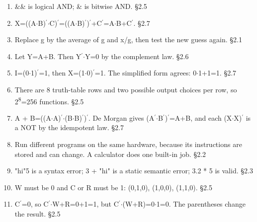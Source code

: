 \documentclass[11pt]{article}
\begin{document}
\begin{keepsection}
\begin{enumerate}
\item \&\& is logical AND; \& is bitwise AND. \hfill{\small\color{FAUblue}§2.5}
\item X=((A\ensuremath{\cdot}B)\ensuremath{{}^{\prime}}\ensuremath{\cdot}C)\ensuremath{{}^{\prime}}=((A\ensuremath{\cdot}B)\ensuremath{{}^{\prime}})\ensuremath{{}^{\prime}}+C\ensuremath{{}^{\prime}}=A\ensuremath{\cdot}B+C\ensuremath{{}^{\prime}}. \hfill{\small\color{FAUblue}§2.7}
\item Replace g by the average of g and x/g, then test the new guess again. \hfill{\small\color{FAUblue}§2.1}
\item Let Y=A+B. Then Y\ensuremath{{}^{\prime}}\ensuremath{\cdot}Y=0 by the complement law. \hfill{\small\color{FAUblue}§2.6}
\item I=(0\ensuremath{\cdot}1)\ensuremath{{}^{\prime}}=1, then X=(1\ensuremath{\cdot}0)\ensuremath{{}^{\prime}}=1. The simplified form agrees: 0\ensuremath{\cdot}1+1=1. \hfill{\small\color{FAUblue}§2.7}
\item There are 8 truth-table rows and two possible output choices per row, so 2\textsuperscript{8}=256 functions. \hfill{\small\color{FAUblue}§2.5}
\item A + B=((A\ensuremath{\cdot}A)\ensuremath{{}^{\prime}}\ensuremath{\cdot}(B\ensuremath{\cdot}B)\ensuremath{{}^{\prime}})\ensuremath{{}^{\prime}}. De Morgan gives (A\ensuremath{{}^{\prime}}\ensuremath{\cdot}B\ensuremath{{}^{\prime}})\ensuremath{{}^{\prime}}=A+B, and each (X\ensuremath{\cdot}X)\ensuremath{{}^{\prime}} is a NOT by the idempotent law. \hfill{\small\color{FAUblue}§2.7}
\item Run different programs on the same hardware, because its instructions are stored and can change. A calculator does one built-in job. \hfill{\small\color{FAUblue}§2.2}
\item "hi"5 is a syntax error; 3 + "hi" is a static semantic error; 3.2 * 5 is valid. \hfill{\small\color{FAUblue}§2.3}
\item W must be 0 and C or R must be 1: (0,1,0), (1,0,0), (1,1,0). \hfill{\small\color{FAUblue}§2.5}
\item C\ensuremath{{}^{\prime}}=0, so C\ensuremath{{}^{\prime}}\ensuremath{\cdot}W+R=0+1=1, but C\ensuremath{{}^{\prime}}\ensuremath{\cdot}(W+R)=0\ensuremath{\cdot}1=0. The parentheses change the result. \hfill{\small\color{FAUblue}§2.5}
\end{enumerate}

\end{keepsection}
\end{document}
